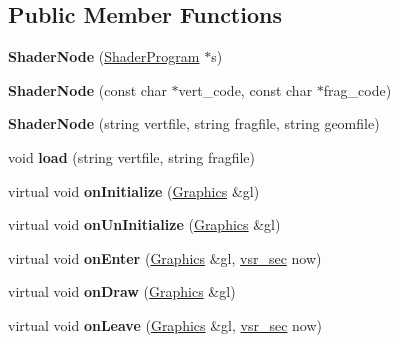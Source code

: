 \subsection*{Public Member Functions}
\begin{DoxyCompactItemize}
\item 
\hypertarget{classvsr_1_1_shader_node_aeb0a9e37062ea55a65b599cbdb3ae967}{{\bfseries Shader\-Node} (\hyperlink{classvsr_1_1_shader_program}{Shader\-Program} $\ast$s)}\label{classvsr_1_1_shader_node_aeb0a9e37062ea55a65b599cbdb3ae967}

\item 
\hypertarget{classvsr_1_1_shader_node_a892f617c6f61ce0fdb1db463a77f3a20}{{\bfseries Shader\-Node} (const char $\ast$vert\-\_\-code, const char $\ast$frag\-\_\-code)}\label{classvsr_1_1_shader_node_a892f617c6f61ce0fdb1db463a77f3a20}

\item 
\hypertarget{classvsr_1_1_shader_node_ab40ef468c06b6f2188a109ef9ad0061f}{{\bfseries Shader\-Node} (string vertfile, string fragfile, string geomfile)}\label{classvsr_1_1_shader_node_ab40ef468c06b6f2188a109ef9ad0061f}

\item 
\hypertarget{classvsr_1_1_shader_node_aa7bda3ed961798c3d968c4f9e37ab453}{void {\bfseries load} (string vertfile, string fragfile)}\label{classvsr_1_1_shader_node_aa7bda3ed961798c3d968c4f9e37ab453}

\item 
\hypertarget{classvsr_1_1_shader_node_a44814cd8ec852468ef8b4783bad66d39}{virtual void {\bfseries on\-Initialize} (\hyperlink{classvsr_1_1_graphics}{Graphics} \&gl)}\label{classvsr_1_1_shader_node_a44814cd8ec852468ef8b4783bad66d39}

\item 
\hypertarget{classvsr_1_1_shader_node_a44187d137ffce18220d35a37e1e779dc}{virtual void {\bfseries on\-Un\-Initialize} (\hyperlink{classvsr_1_1_graphics}{Graphics} \&gl)}\label{classvsr_1_1_shader_node_a44187d137ffce18220d35a37e1e779dc}

\item 
\hypertarget{classvsr_1_1_shader_node_acbd669fb16d2cfb02d2c38d2c7ecab03}{virtual void {\bfseries on\-Enter} (\hyperlink{classvsr_1_1_graphics}{Graphics} \&gl, \hyperlink{classvsr_1_1vsr__sec}{vsr\-\_\-sec} now)}\label{classvsr_1_1_shader_node_acbd669fb16d2cfb02d2c38d2c7ecab03}

\item 
\hypertarget{classvsr_1_1_shader_node_a1c2442d4869d3f9150116e923cdd4ccb}{virtual void {\bfseries on\-Draw} (\hyperlink{classvsr_1_1_graphics}{Graphics} \&gl)}\label{classvsr_1_1_shader_node_a1c2442d4869d3f9150116e923cdd4ccb}

\item 
\hypertarget{classvsr_1_1_shader_node_ad14429de3ce373c91cffa6c377e47fed}{virtual void {\bfseries on\-Leave} (\hyperlink{classvsr_1_1_graphics}{Graphics} \&gl, \hyperlink{classvsr_1_1vsr__sec}{vsr\-\_\-sec} now)}\label{classvsr_1_1_shader_node_ad14429de3ce373c91cffa6c377e47fed}

\end{DoxyCompactItemize}
